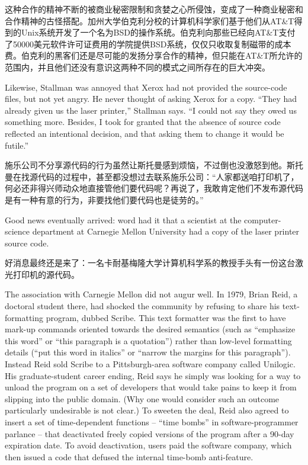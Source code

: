 \ifdefined\chs
这种合作的精神不断的被商业秘密限制和贪婪之心所侵蚀，变成了一种商业秘密和合作精神的古怪搭配。加州大学伯克利分校的计算机科学家们基于他们从AT\&T得到的Unix系统开发了一个名为BSD的操作系统。伯克利向那些已经向AT\&T支付了50000美元软件许可证费用的学院提供BSD系统，仅仅只收取复制磁带的成本费。伯克利的黑客们还是尽可能的发扬分享合作的精神，但只能在AT\&T所允许的范围内，并且他们还没有意识这两种不同的模式之间所存在的巨大冲突。
\fi

\ifdefined\eng
Likewise, Stallman was annoyed that Xerox had not provided the source-code files, but not yet angry.  He never thought of asking Xerox for a copy. ``They had already given us the laser printer,'' Stallman says. ``I could not say they owed us something more.  Besides, I took for granted that the absence of source code reflected an intentional decision, and that asking them to change it would be futile.''
\fi

\ifdefined\chs
施乐公司不分享源代码的行为虽然让斯托曼感到烦恼，不过倒也没激怒到他。斯托曼在找源代码的过程中，甚至都没想过去联系施乐公司：“人家都送咱打印机了，何必还非得兴师动众地直接管他们要代码呢？再说了，我敢肯定他们不发布源代码是有一种有意的行为，非要找他们要代码也是徒劳的。”
\fi

\ifdefined\eng
Good news eventually arrived: word had it that a scientist at the computer-science department at Carnegie Mellon University had a copy of the laser printer source code.
\fi

\ifdefined\chs
好消息最终还是来了：一名卡耐基梅隆大学计算机科学系的教授手头有一份这台激光打印机的源代码。
\fi

\ifdefined\eng
The association with Carnegie Mellon did not augur well. In 1979, Brian Reid, a doctoral student there, had shocked the community by refusing to share his text-formatting program, dubbed Scribe.  This text formatter was the first to have mark-up commands oriented towards the desired semantics (such as ``emphasize this word'' or ``this paragraph is a quotation'') rather than low-level formatting details (``put this word in italics'' or ``narrow the margins for this paragraph''). Instead Reid sold Scribe to a Pittsburgh-area software company called Unilogic. His graduate-student career ending, Reid says he simply was looking for a way to unload the program on a set of developers that would take pains to keep it from slipping into the public domain.  (Why one would consider such an outcome particularly undesirable is not clear.) To sweeten the deal, Reid also agreed to insert a set of time-dependent functions -- ``time bombs'' in software-programmer parlance -- that deactivated freely copied versions of the program after a 90-day expiration date. To avoid deactivation, users paid the software company, which then issued a code that defused the internal time-bomb anti-feature.
\fi

